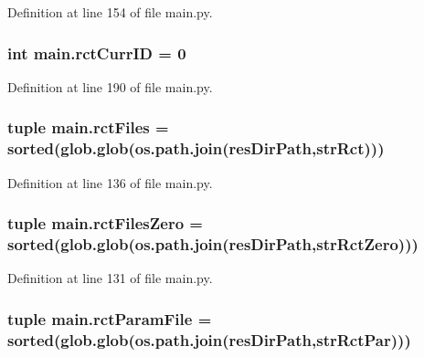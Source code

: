 Definition at line 154 of file main.\-py.

\hypertarget{a00117_a53e397dea15f17442a198395e65b377b}{
\subsubsection[{rct\-Curr\-I\-D}]{\setlength{\rightskip}{0pt plus 5cm}int main.\-rct\-Curr\-I\-D = 0}}\label{a00117_a53e397dea15f17442a198395e65b377b}


Definition at line 190 of file main.\-py.

\hypertarget{a00117_a9016a8f5eafe76e4e8dbb1bc3ce94af5}{
\subsubsection[{rct\-Files}]{\setlength{\rightskip}{0pt plus 5cm}tuple main.\-rct\-Files = sorted(glob.\-glob(os.\-path.\-join({\bf res\-Dir\-Path},{\bf str\-Rct})))}}\label{a00117_a9016a8f5eafe76e4e8dbb1bc3ce94af5}


Definition at line 136 of file main.\-py.

\hypertarget{a00117_aa37eddd86a00bf98dff8cc9260d6d13b}{
\subsubsection[{rct\-Files\-Zero}]{\setlength{\rightskip}{0pt plus 5cm}tuple main.\-rct\-Files\-Zero = sorted(glob.\-glob(os.\-path.\-join({\bf res\-Dir\-Path},{\bf str\-Rct\-Zero})))}}\label{a00117_aa37eddd86a00bf98dff8cc9260d6d13b}


Definition at line 131 of file main.\-py.

\hypertarget{a00117_ac4e9cba2fd0b813ba19029541ad609e5}{
\subsubsection[{rct\-Param\-File}]{\setlength{\rightskip}{0pt plus 5cm}tuple main.\-rct\-Param\-File = sorted(glob.\-glob(os.\-path.\-join({\bf res\-Dir\-Path},{\bf str\-Rct\-Par})))}}\label{a00117_ac4e9cba2fd0b813ba19029541ad609e5}


